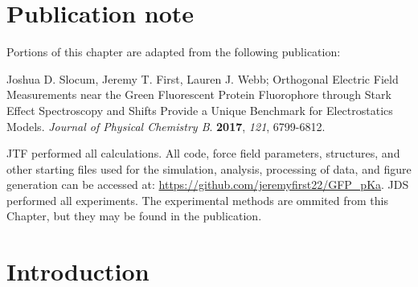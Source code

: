 \section{Publication note} \label{pKa-pub-note}

Portions of this chapter are adapted from the following publication: 

\noindent Joshua D. Slocum, Jeremy T. First, Lauren J. Webb; Orthogonal Electric Field Measurements near the Green Fluorescent Protein Fluorophore through Stark Effect Spectroscopy and \pKa{} Shifts Provide a Unique Benchmark for Electrostatics Models. \emph{Journal of Physical Chemistry B}. \textbf{2017}, \emph{121}, 6799-6812.

JTF performed all calculations. 
All code, force field parameters, structures, and other starting files used for the simulation, analysis, processing of data, and figure generation can be accessed at:
\url{https://github.com/jeremyfirst22/GFP_pKa}. 
JDS performed all experiments. The experimental methods are ommited from this Chapter, but they may be found in the publication. 

\section{Introduction} \label{pKa-intro}

